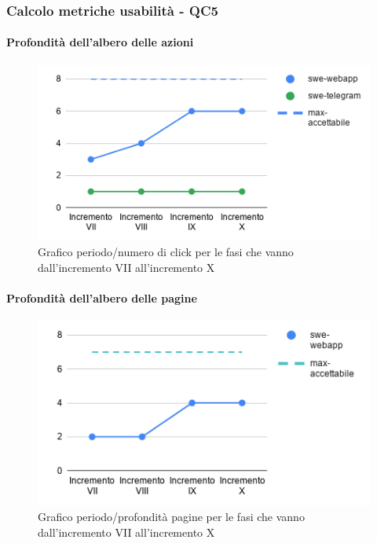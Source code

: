\subsubsection{Calcolo metriche usabilità - QC5}
\paragraph{Profondità dell'albero delle azioni}
\begin{figure}[H]
			\centering
			\includegraphics[width=0.8\linewidth]{./res/images/QM-PROD-9-PAA.png}
			\caption{Grafico periodo/numero di click per le fasi che vanno dall'incremento VII all'incremento X}
			\label{fig:Grafico periodo/numero di click per le fasi che vanno dall'incremento VII all'incremento X}
	\end{figure}
\paragraph{Profondità dell'albero delle pagine}
\begin{figure}[H]
			\centering
			\includegraphics[width=0.8\linewidth]{./res/images/QM-PROD-10-PAP.png}
			\caption{Grafico periodo/profondità pagine per le fasi che vanno dall'incremento VII all'incremento X}
			\label{fig:Grafico periodo/profondità pagine per le fasi che vanno dall'incremento VII all'incremento X}
	\end{figure}

